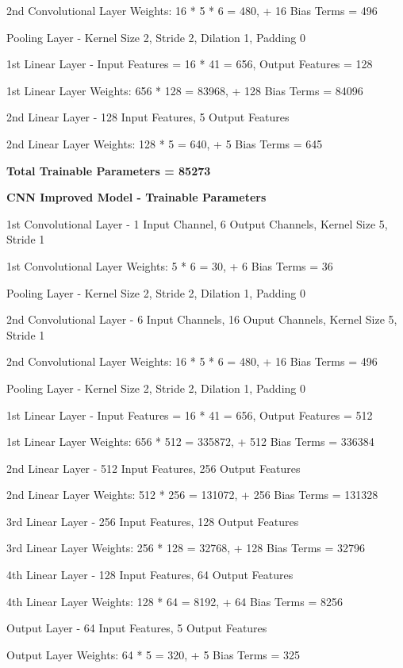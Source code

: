 \documentclass[12pt]{article}
\begin{document}
{{{{{{{{2nd Convolutional Layer Weights: 16 * 5 * 6 = 480, + 16 Bias Terms = 496

Pooling Layer - Kernel Size 2, Stride 2, Dilation 1, Padding 0

1st Linear Layer - Input Features = 16 * 41 = 656, Output Features = 128

1st Linear Layer Weights: 656 * 128 = 83968, + 128 Bias Terms = 84096

2nd Linear Layer - 128 Input Features, 5 Output Features

2nd Linear Layer Weights: 128 * 5 = 640, + 5 Bias Terms = 645

\textbf{Total Trainable Parameters = 85273}
  
\bigskip

\textbf{CNN Improved Model - Trainable Parameters}

1st Convolutional Layer - 1 Input Channel, 6 Output Channels, Kernel Size 5, Stride 1

1st Convolutional Layer Weights: 5 * 6 = 30, + 6 Bias Terms = 36

Pooling Layer - Kernel Size 2, Stride 2, Dilation 1, Padding 0

2nd Convolutional Layer - 6 Input Channels, 16 Ouput Channels, Kernel Size 5, Stride 1

2nd Convolutional Layer Weights: 16 * 5 * 6 = 480, + 16 Bias Terms = 496

Pooling Layer - Kernel Size 2, Stride 2, Dilation 1, Padding 0

1st Linear Layer - Input Features = 16 * 41 = 656, Output Features = 512

1st Linear Layer Weights: 656 * 512 = 335872, + 512 Bias Terms = 336384

2nd Linear Layer - 512 Input Features, 256 Output Features

2nd Linear Layer Weights: 512 * 256 = 131072, + 256 Bias Terms = 131328

3rd Linear Layer - 256 Input Features, 128 Output Features

3rd Linear Layer Weights: 256 * 128 = 32768, + 128 Bias Terms = 32796

4th Linear Layer - 128 Input Features, 64 Output Features

4th Linear Layer Weights: 128 * 64 = 8192, + 64 Bias Terms = 8256

Output Layer - 64 Input Features, 5 Output Features

Output Layer Weights: 64 * 5 = 320, + 5 Bias Terms = 325

}}}}}}}}
\end{document}
